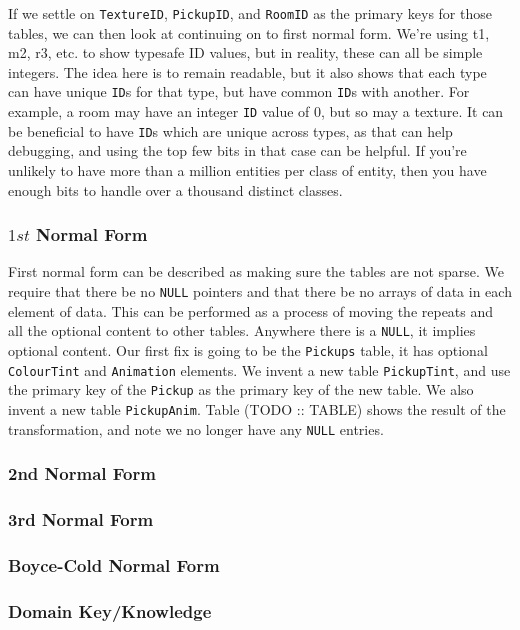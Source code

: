 \documentclass[a4paper,12pt]{article}
\begin{document}
If we settle on \texttt{TextureID}, \texttt{PickupID}, and \texttt{RoomID} as the primary keys for those tables, we can then look at continuing on to first normal form.
We're using t1, m2, r3, etc. to show typesafe ID values, but in reality, these can all be simple integers.
The idea here is to remain readable, but it also shows that each type can have unique \texttt{ID}s for that type, but have common \texttt{ID}s with another.
For example, a room may have an integer \texttt{ID} value of 0, but so may a texture.
It can be beneficial to have \texttt{ID}s which are unique across types, as that can help debugging, and using the top few bits in that case can be helpful.
If you're unlikely to have more than a million entities per class of entity, then you have enough bits to handle over a thousand distinct classes.

\subsubsection{$1st$ Normal Form}

First normal form can be described as making sure the tables are not sparse.
We require that there be no \texttt{NULL} pointers and that there be no arrays of data in each element of data.
This can be performed as a process of moving the repeats and all the optional content to other tables.
Anywhere there is a \texttt{NULL}, it implies optional content.
Our first fix is going to be the \texttt{Pickups} table, it has optional \texttt{ColourTint} and \texttt{Animation} elements.
We invent a new table \texttt{PickupTint}, and use the primary key of the \texttt{Pickup} as the primary key of the new table.
We also invent a new table \texttt{PickupAnim}.
Table (TODO :: TABLE) shows the result of the transformation, and note we no longer have any \texttt{NULL} entries.

\subsubsection{2nd Normal Form}
\subsubsection{3rd Normal Form}
\subsubsection{Boyce-Cold Normal Form}
\subsubsection{Domain Key/Knowledge}
\end{document}

